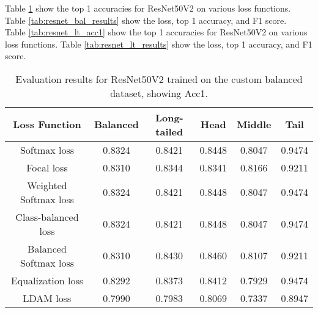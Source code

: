 Table \ref{tab:resnet_bal_acc1} show the top 1 accuracies for ResNet50V2 on various loss functions. Table \ref{tab:resnet_bal_results} show the loss, top 1 accuracy, and F1 score.\\

Table \ref{tab:resnet_lt_acc1} show the top 1 accuracies for ResNet50V2 on various loss functions. Table \ref{tab:resnet_lt_results} show the loss, top 1 accuracy, and F1 score. 

\begin{table}[H]
    \centering
    \begin{tabular}{cccccc}
        \toprule
        Loss Function & Balanced & Long-tailed & Head & Middle & Tail \\ 
        \midrule
        Softmax loss   & 0.8324  & 0.8421 & 0.8448 & 0.8047 & 0.9474 \\
        Focal loss   & 0.8310  & 0.8344 & 0.8341 & 0.8166 & 0.9211 \\
        Weighted Softmax loss   & 0.8324 & 0.8421 & 0.8448 & 0.8047 & 0.9474 \\
        Class-balanced loss   &  0.8324 & 0.8421 & 0.8448 & 0.8047 & 0.9474 \\
        Balanced Softmax loss   & 0.8310 & 0.8430 & 0.8460 & 0.8107 & 0.9211 \\
        Equalization loss   & 0.8292 & 0.8373 & 0.8412 & 0.7929 & 0.9474 \\
        LDAM loss   & 0.7990 & 0.7983 & 0.8069 & 0.7337 & 0.8947 \\
        \bottomrule
    \end{tabular}
    \caption{Evaluation results for ResNet50V2 trained on the custom balanced dataset, showing Acc1.}
    \label{tab:resnet_bal_acc1}
\end{table}

